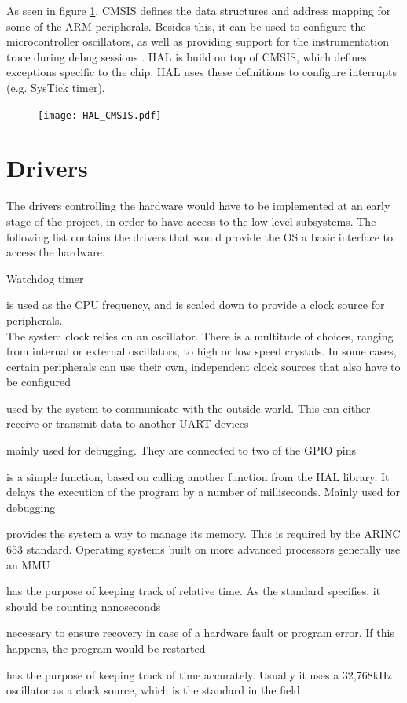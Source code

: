 As seen in figure \ref{fig:CMSIS_HAL}, CMSIS
defines the data structures and address mapping for some of the ARM peripherals.
Besides this, it can be used to configure the microcontroller
oscillators, as well as providing support for the instrumentation trace during debug sessions \cite{cmsis_reference}.
HAL is build on top of CMSIS, which defines exceptions specific to the chip.
HAL uses these definitions to configure interrupts (e.g. SysTick timer).

\begin{figure}[H]
\centering
\texttt{[image: HAL\_CMSIS.pdf]}
\label{fig:CMSIS_HAL}
\end{figure}


\section{Drivers}
The drivers controlling the hardware would have to be implemented at an
early stage of the project, in order to have access to the low level
subsystems.
The following list contains the drivers that would provide the OS a basic
interface to access the hardware.

\begin{labeling}{Watchdog timer}
	\item [\textbf{System Clock}] is used as the CPU frequency,
	and is scaled down to provide a clock source for peripherals.\\
	The system clock relies on an oscillator.
	There is a multitude of choices, ranging from internal or external
	oscillators, to high or low speed crystals. In some cases, certain
	peripherals can use their own, independent clock sources that also have
	to be configured
	\item [\textbf{UART}] used by the system to communicate with the outside
	world. This can either receive or transmit data to another UART devices
	\item [\textbf{LEDs}] mainly used for debugging. They are
	connected to two of the GPIO pins
	\item [\textbf{Delay}] is a simple function, based on calling another
	function from the HAL library. It delays the execution
	of the program by a number of milliseconds. Mainly used for debugging
	\item [\textbf{MPU}] provides the system a way to manage its
	memory. This is required by the ARINC 653 standard.
	Operating systems built on more advanced processors generally use
	an MMU
	\item [\textbf{Timing}] has the purpose of keeping track of
	relative time. As the standard specifies, it should be counting
	nanoseconds
	\item [\textbf{Watchdog timer}] necessary to ensure recovery
	in case of a hardware fault or program error. If this happens, the
	program would be restarted
	\item [\textbf{RTC}] has the purpose of keeping track of
	time accurately. Usually it uses  a 32,768kHz oscillator as a
	clock source, which is the standard in the field
\end{labeling}


